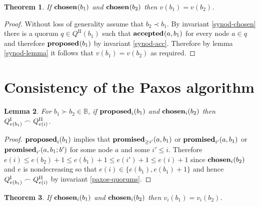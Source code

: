 \documentclass[journal]{IEEEtran}
\newtheorem{theorem}{Theorem}
\newtheorem{lemma}[theorem]{Lemma}
\begin{document}
\begin{theorem}\label{synod-safety-theorem} If $\mathbf{chosen}_{}(b_1)$ and
$\mathbf{chosen}_{}(b_2)$ then $v(b_1) = v(b_2)$.  \end{theorem}

\begin{proof} Without loss of generality assume that ${b_2 \prec b_1}$. By
invariant \ref{synod-chosen} there is a quorum $q \in Q^\textrm{II}(b_1)$ such
that $\mathbf{accepted}_{}(a,b_1)$ for every node $a \in q$ and therefore $\mathbf{proposed}_{}(b_1)$ by
invariant \ref{synod-acc}.  Therefore by lemma \ref{synod-lemma} it follows
that $v(b_1) = v(b_2)$ as required.  \end{proof}

\section{Consistency of the Paxos algorithm}\label{paxos-invariants}

\begin{lemma}\label{paxos-synod-quorum-invariant} For $b_1 \succ b_2 \in
\mathbb B$, if $\mathbf{proposed}_{i}(b_1)$ and $\mathbf{chosen}_{i}(b_2)$ then
${{Q}^\textrm{I}_{e(b_1)} \frown {Q}^\textrm{II}_{e(i)}}$.  \end{lemma}

\begin{proof} $\mathbf{proposed}_{i}(b_1)$ implies that $\mathbf{promised}_{\ge i'}(a,b_1)$ or
$\mathbf{promised}_{i'}(a,b_1)$ or $\mathbf{promised}_{i'}(a,b_1;b')$ for some node $a$ and some $i'
\le i$. Therefore $e(i) \le e(b_2) + 1 \le e(b_1) + 1 \le e(i') + 1 \le e(i) +
1$ since $\mathbf{chosen}_{i}(b_2)$ and $e$ is nondecreasing so that $e(i) \in \{
e(b_1), e(b_1) + 1 \}$ and hence ${{Q}^\textrm{I}_{e(b_1)} \frown {Q}^\textrm{II}_{e(i)}}$ by invariant
\ref{paxos-quorums}.  \end{proof}

\begin{theorem}\label{paxos-safety-theorem} If $\mathbf{chosen}_{i}(b_1)$ and
$\mathbf{chosen}_{i}(b_2)$ then ${v_i(b_1) = v_i(b_2)}$.  \end{theorem}
\end{document}
